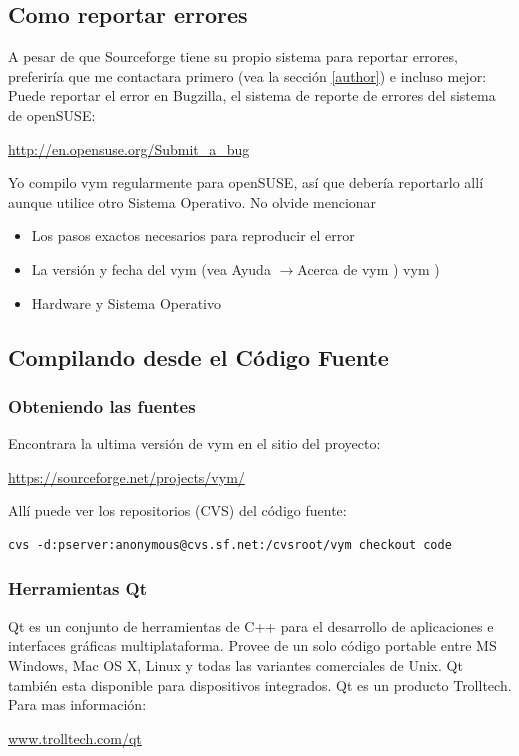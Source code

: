 \documentclass{article}
\newcommand{\vym}{{\sc vym }}
\newcommand{\ra}{$\longrightarrow$}
\begin{document}
\begin{appendix}
\subsection{Como reportar errores}
A pesar de que Sourceforge tiene su propio sistema para reportar errores, preferir\'ia que me contactara primero (vea la secci\'on \ref{author}) e incluso mejor: Puede reportar el error en Bugzilla, el sistema de reporte de errores del sistema de openSUSE:
\begin{center}
\href{http://en.opensuse.org/Submit_a_bug}{http://en.opensuse.org/Submit\_a\_bug}
\end{center}
Yo compilo \vym regularmente para openSUSE, as\'i que deber\'ia reportarlo all\'i aunque utilice otro Sistema Operativo. No olvide mencionar
\begin{itemize}
    \item Los pasos exactos necesarios para reproducir el error
    \item La versi\'on y fecha del \vym (vea Ayuda \ra Acerca de \vym)
    \vym)
    \item Hardware y Sistema Operativo
\end{itemize}

\subsection{Compilando desde el C\'odigo Fuente}
\subsubsection{Obteniendo las fuentes} \label{getsources}
Encontrara la ultima versi\'on de \vym en el sitio del proyecto:
\begin{center}
\href{https://sourceforge.net/projects/vym/}{https://sourceforge.net/projects/vym/}
\end{center}
All\'i puede ver los repositorios (CVS) del c\'odigo fuente:

\begin{verbatim}
cvs -d:pserver:anonymous@cvs.sf.net:/cvsroot/vym checkout code
\end{verbatim}

\subsubsection{Herramientas Qt}
Qt es un conjunto de herramientas de C++ para el desarrollo de aplicaciones e interfaces gr\'aficas multiplataforma. Provee de un solo c\'odigo portable entre MS Windows, Mac OS X, Linux y todas las variantes comerciales de Unix. Qt tambi\'en esta disponible para dispositivos integrados. Qt es un producto Trolltech. Para mas informaci\'on:
\begin{center}
\href{http://www.trolltech.com/qt/}{www.trolltech.com/qt} 
\end{center}



\end{appendix}
\end{document}
